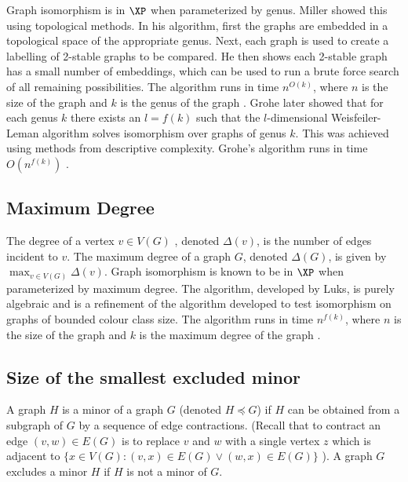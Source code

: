 \documentclass[11pt]{report}
\begin{document}
Graph isomorphism is in $\XP$ when parameterized by genus. Miller showed this using topological methods. In his algorithm, first the graphs are embedded in a topological space of the appropriate genus. Next, each graph is used to create a labelling of 2-stable graphs to be compared. He then shows each 2-stable graph has a small number of embeddings, which can be used to run a brute force search of all remaining possibilities. The algorithm runs in time $n^{O(k)}$, where $n$ is the size of the graph and $k$ is the genus of the graph \cite{Miller80}. Grohe later showed that for each genus $k$ there exists an $l=f(k)$ such that the $l$-dimensional Weisfeiler-Leman algorithm solves isomorphism over graphs of genus $k$. This was achieved using methods from descriptive complexity. Grohe's algorithm runs in time $O(n^{f(k)})$ \cite{Grohe00}.






\subsection{Maximum Degree} 

The degree of a vertex $v\in V(G)$ , denoted $\Delta (v)$, is the number of edges incident to $v$. The maximum degree of a graph $G$, denoted $\Delta (G)$, is given by $\displaystyle\max_{v\in V(G)} \Delta (v)$. Graph isomorphism is known to be in $\XP$ when parameterized by maximum degree. The algorithm, developed by Luks, is purely algebraic and is a refinement of the algorithm developed to test isomorphism on graphs of bounded colour class size. The algorithm runs in time  $n^{f(k)}$, where $n$ is the size of the graph and $k$ is the maximum degree of the graph \cite{Luks82}.





\subsection{Size of the smallest excluded minor}

A graph $H$ is a minor of a graph $G$ (denoted $H\preceq G$) if $H$ can be obtained from a subgraph of $G$ by a sequence of edge contractions. (Recall that to contract an edge $(v,w)\in E(G)$ is to replace $v$ and $w$ with a single vertex $z$ which is adjacent to $\{ x \in V(G) : (v,x) \in E(G) \vee (w,x) \in E(G) \}$ ). A graph $G$ excludes a minor $H$ if $H$ is not a minor of $G$.
\end{document}
